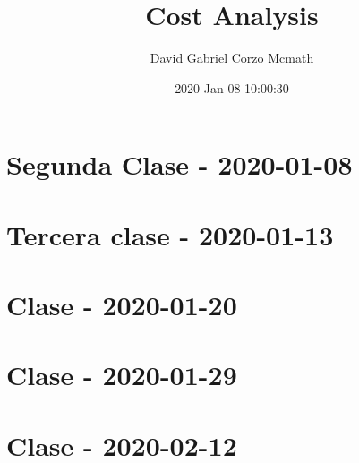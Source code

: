 \documentclass{book}
\title{Cost Analysis}
\author{David Gabriel Corzo Mcmath}
\date{2020-Jan-08 10:00:30}
\begin{document}
\maketitle
\tableofcontents

\chapter{Segunda Clase - 2020-01-08}


\chapter{Tercera clase - 2020-01-13}


\chapter{Clase - 2020-01-20}


\chapter{Clase - 2020-01-29}


\chapter{Clase - 2020-02-12}

\end{document}
